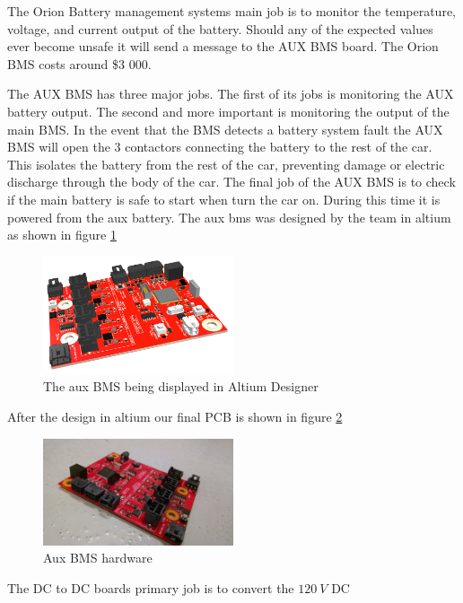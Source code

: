 \documentclass{article}
\begin{document}
    The Orion Battery management systems main job is to monitor the
    temperature, voltage, and current output of the battery. Should any
    of the expected values ever become unsafe it will send a message to
    the AUX BMS board. The Orion BMS costs around \$3 000.\\
    \par The AUX BMS has three major jobs. The first of its jobs is
    monitoring the AUX battery output. The second and more important is
    monitoring the output of the main BMS. In the event that the BMS
    detects a battery system fault the AUX BMS will open the 3
    contactors connecting the battery to the rest of the car. This
    isolates the battery from the rest of the car, preventing damage or
    electric discharge through the body of the car. The final job of the
    AUX BMS is to check if the main battery is safe to start when turn
    the car on. During this time it is powered from the aux battery. The
    aux bms was designed by the team in altium as shown in figure
    \ref{fig:aux-bms-alt}
    \begin{figure}[H]
        \centering
        \includegraphics[width=0.5\textwidth]{images/aux_bms_alt.png}
        \caption{The aux BMS being displayed in Altium Designer}
        \label{fig:aux-bms-alt}
    \end{figure}
    \noindent After the design in altium our final PCB is shown in
    figure \ref{fig:aux-bms}
    \begin{figure}[H]
        \centering
        \includegraphics[width=0.5\textwidth]{images/aux_bms.jpeg}
        \caption{Aux BMS hardware}
        \label{fig:aux-bms}
    \end{figure}
    \par The DC to DC boards primary job is to convert the $120\ V$ DC
\end{document}
